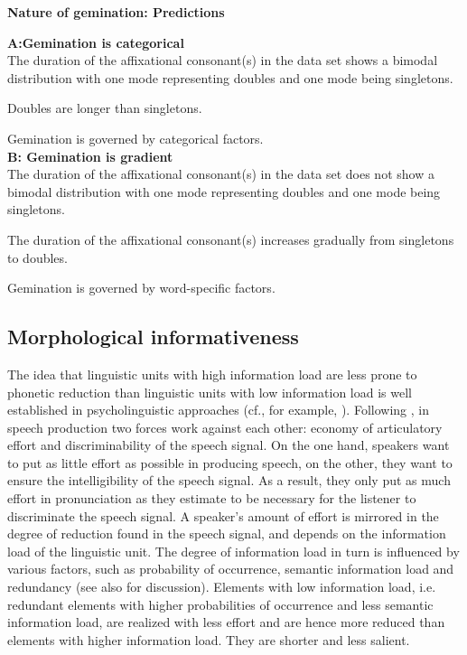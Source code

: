 {\noindent \textbf{Nature of gemination: Predictions}\\	\label{predictions nature of gemination}

\noindent \textbf{A:\hspace{0.5cm}Gemination is categorical} \\



\noindent	The duration of the affixational consonant(s) in the data set shows a bimodal distribution with one mode representing doubles and one mode being singletons.
	
\noindent	Doubles are longer than singletons. 
	
\noindent	Gemination is governed by categorical factors.	\\



\noindent	\textbf{B: \hspace{0.5cm}Gemination is gradient} \\
		
\noindent	The duration of the affixational consonant(s) in the data set does not show a bimodal distribution with one mode representing doubles and one mode being singletons. 

\noindent	The duration of the affixational consonant(s) increases gradually from singletons to doubles.  
	
\noindent	Gemination is governed by word-specific factors.
	



\subsection{Morphological informativeness} \label{morphological informativeness}

The idea that linguistic units with high information load are less prone to phonetic reduction than linguistic units with low information load is well established in psycholinguistic approaches  (cf., for example, \citealt{Aylett.2004,Kuperman.2007,Pluymaekers.2010,Hanique.2012}). Following \cite{Lindblom.1990}, in speech production two forces work against each other: economy of articulatory effort and discriminability of the speech signal. On the one hand, speakers want to put as little effort as possible in producing speech, on the other, they want to ensure the intelligibility of the speech signal. As a result, they only put as much effort in pronunciation as they estimate to be necessary for the listener to discriminate the speech signal. A speaker's amount of effort is mirrored in the degree of reduction found in the speech signal, and depends on the information load of the linguistic unit. The degree of information load in turn is influenced by various factors, such as probability of occurrence, semantic information load and redundancy (see also \cite{Kuperman.2007} for discussion).  
Elements with low information load, i.e. redundant elements with higher probabilities of occurrence and less semantic information load, are realized with less effort and are hence more reduced than elements with higher information load. They are shorter and less salient. 

}
